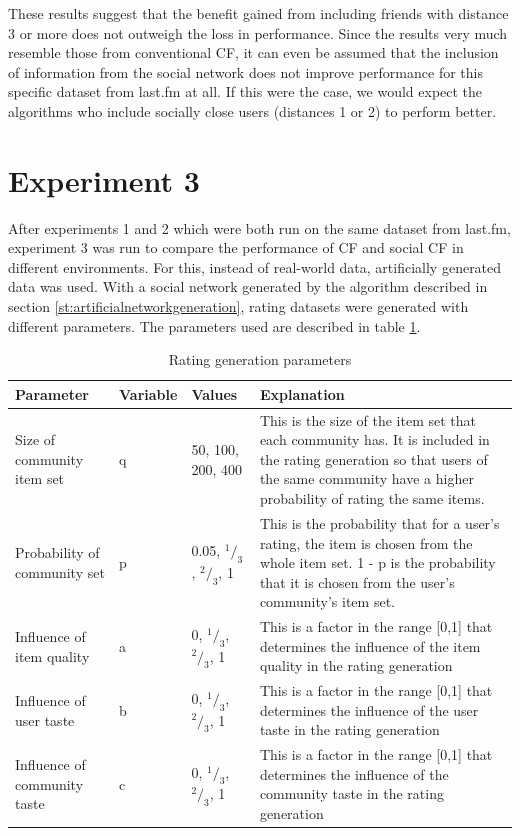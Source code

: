 These results suggest that the benefit gained from including friends with distance 3 or more does not outweigh the loss in performance. Since the results very much resemble those from conventional CF, it can even be assumed that the inclusion of information from the social network does not improve performance for this specific dataset from last.fm at all. If this were the case, we would expect the algorithms who include socially close users (distances 1 or 2) to perform better.
\section{Experiment 3}
\label{st:experiment3} After experiments 1 and 2 which were both run on the same dataset from last.fm, experiment 3 was run to compare the performance of CF and social CF in different environments. For this, instead of real-world data, artificially generated data was used. With a social network generated by the algorithm described in section \ref{st:artificialnetworkgeneration}, rating datasets were generated with different parameters. The parameters used are described in table \ref{t:ratinggenerationparameters}.

\begin{table}[h]
	\begin{center}
    	\begin{tabular}{ | l | l | l | p{5.5cm} |}
   	 \hline
    	Parameter & Variable & Values & Explanation \\ \hline
    	Size of community item set & q & 50, 100, 200, 400 & This is the size of the item set that each community has. It is included in the rating generation so that users of the same community have a higher probability of rating the same items.  \\ \hline
    	Probability of community set & p & 0.05, $^1 / _3$, $^2 / _3$, 1 & This is the probability that for a user's rating, the item is chosen from the whole item set. 1 - p is the probability that it is chosen from the user's community's item set. \\ \hline
    	Influence of item quality & a & 0, $^1 / _3$, $^2 / _3$, 1 & This is a factor in the range [0,1] that determines the influence of the item quality in the rating generation \\ \hline
    	Influence of user taste & b & 0, $^1 / _3$, $^2 / _3$, 1 & This is a factor in the range [0,1] that determines the influence of the user taste in the rating generation \\ \hline
    	Influence of community taste & c & 0, $^1 / _3$, $^2 / _3$, 1 & This is a factor in the range [0,1] that determines the influence of the community taste in the rating generation \\ \hline
    	\end{tabular}
    	\caption{Rating generation parameters}
    	\label{t:ratinggenerationparameters}
    	\end{center}
\end{table}

